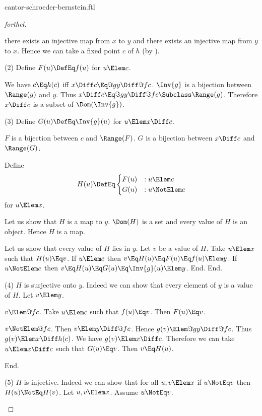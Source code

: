 \documentclass{stex}
\begin{document}
\begin{smodule}{cantor-schroeder-bernstein.ftl}
\begin{proof}[forthel]
\begin{case}{there exists an injective map from $x$ to $y$ and there exists an injective map from $y$ to $x$.}
    Hence we can take a fixed point $c$ of $h$ (by ).

    (2) Define $F(u) \DefEq f(u)$ for $u \Elem c$.

    We have $c \Eq h(c)$ iff $x \Diff c \Eq \Im{g}{y \Diff \Im{f}{c}}$.
    $\Inv{g}$ is a bijection between $\Range(g)$ and $y$.
    Thus $x \Diff c \Eq \Im{g}{y \Diff \Im{f}{c}} \Subclass \Range(g)$.
    Therefore $x \Diff c$ is a subset of $\Dom(\Inv{g})$.

    (3) Define $G(u) \DefEq \Inv{g}(u)$ for $u \Elem x \Diff c$.

    $F$ is a bijection between $c$ and $\Range(F)$.
    $G$ is a bijection between $x \Diff c$ and $\Range(G)$.

    Define \[ H(u) \DefEq
      \begin{cases}
        F(u) & : u \Elem c \\
        G(u) & : u \NotElem c
      \end{cases} \]
    for $u \Elem x$.

    Let us show that $H$ is a map to $y$.
      $\Dom(H)$ is a set and every value of $H$ is an object.
      Hence $H$ is a map.

      Let us show that every value of $H$ lies in $y$.
        Let $v$ be a value of $H$.
        Take $u \Elem x$ such that $H(u) \Eq v$.
        If $u \Elem c$ then $v \Eq H(u) \Eq F(u) \Eq f(u) \Elem y$.
        If $u \NotElem c$ then $v \Eq H(u) \Eq G(u) \Eq \Inv{g}(u) \Elem y$.
      End.
    End.

    (4) $H$ is surjective onto $y$.
    Indeed we can show that every element of $y$ is a value of $H$.
      Let $v \Elem y$.

      \begin{case}{$v \Elem \Im{f}{c}$.}
        Take $u \Elem c$ such that $f(u) \Eq v$.
        Then $F(u) \Eq v$.
      \end{case}

      \begin{case}{$v \NotElem \Im{f}{c}$.}
        Then $v \Elem y \Diff \Im{f}{c}$.
        Hence $g(v) \Elem \Im{g}{y \Diff \Im{f}{c}}$.
        Thus $g(v) \Elem\linebreak x \Diff h(c)$.
        We have $g(v) \Elem x \Diff c$.
        Therefore we can take $u \Elem x \Diff c$ such that $G(u) \Eq v$.
        Then $v \Eq H(u)$.
      \end{case}
    End.

    (5) $H$ is injective.
    Indeed we can show that for all $u, v \Elem x$ if $u \NotEq v$ then $H(u) \NotEq H(v)$.
      Let $u,v \Elem x$.
      Assume $u \NotEq v$.


\end{case}
\end{proof}
\end{smodule}
\end{document}
